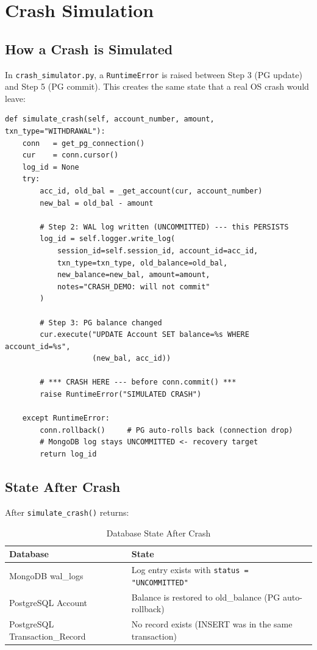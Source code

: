 \chapter{Crash Simulation}

\section{How a Crash is Simulated}

In \texttt{crash\_simulator.py}, a \texttt{RuntimeError} is raised between
Step 3 (PG update) and Step 5 (PG commit). This creates the same state
that a real OS crash would leave:

\begin{lstlisting}[style=pythonstyle, caption={crash\_simulator.py --- crash injection point}]
def simulate_crash(self, account_number, amount, txn_type="WITHDRAWAL"):
    conn   = get_pg_connection()
    cur    = conn.cursor()
    log_id = None
    try:
        acc_id, old_bal = _get_account(cur, account_number)
        new_bal = old_bal - amount

        # Step 2: WAL log written (UNCOMMITTED) --- this PERSISTS
        log_id = self.logger.write_log(
            session_id=self.session_id, account_id=acc_id,
            txn_type=txn_type, old_balance=old_bal,
            new_balance=new_bal, amount=amount,
            notes="CRASH_DEMO: will not commit"
        )

        # Step 3: PG balance changed
        cur.execute("UPDATE Account SET balance=%s WHERE account_id=%s",
                    (new_bal, acc_id))

        # *** CRASH HERE --- before conn.commit() ***
        raise RuntimeError("SIMULATED CRASH")

    except RuntimeError:
        conn.rollback()     # PG auto-rolls back (connection drop)
        # MongoDB log stays UNCOMMITTED <- recovery target
        return log_id
\end{lstlisting}

\section{State After Crash}

After \texttt{simulate\_crash()} returns:

\begin{table}[H]
\centering
\caption{Database State After Crash}
\begin{tabularx}{\textwidth}{lX}
\toprule
\textbf{Database} & \textbf{State} \\
\midrule
MongoDB wal\_logs & Log entry exists with \texttt{status = "UNCOMMITTED"} \\
PostgreSQL Account & Balance is restored to old\_balance (PG auto-rollback) \\
PostgreSQL Transaction\_Record & No record exists (INSERT was in the same transaction) \\
\bottomrule
\end{tabularx}
\end{table}

